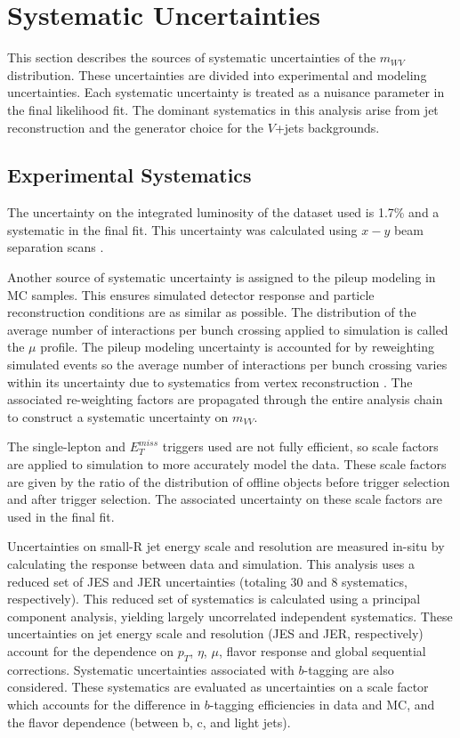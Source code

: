 \chapter{Systematic Uncertainties}
This section describes the sources of systematic uncertainties of the $m_{WV}$ distribution. These uncertainties are divided into experimental and modeling uncertainties. Each systematic uncertainty is treated as a nuisance parameter in the final likelihood fit. The dominant systematics in this analysis arise from jet reconstruction and the generator choice for the $V$+jets backgrounds.

\section{Experimental Systematics}
The uncertainty on the integrated luminosity of the dataset used is 1.7\% and a systematic in the final fit. This uncertainty was calculated using $x-y$ beam separation scans \cite{lumi_measurement}. 

Another source of systematic uncertainty is assigned to the pileup modeling in MC samples. This ensures simulated detector response and particle reconstruction conditions are as similar as possible. The distribution of the average number of interactions per bunch crossing applied to simulation is called the $\mu$ profile. The pileup modeling uncertainty is accounted for by reweighting simulated events so the average number of interactions per bunch crossing varies within its uncertainty due to systematics from vertex reconstruction \cite{vertexing}. The associated re-weighting factors are propagated through the entire analysis chain to construct a systematic uncertainty on $m_{VV}$.

The single-lepton and $E_{T}^{miss}$ triggers used are not fully efficient, so scale factors are applied to simulation to more accurately model the data. These scale factors are given by the ratio of the distribution of offline objects before trigger selection and after trigger selection. The associated uncertainty on these scale factors are used in the final fit.

Uncertainties on small-R jet energy scale and resolution are measured in-situ by calculating the response between data and simulation. This analysis uses a reduced set of JES and JER uncertainties (totaling 30 and 8 systematics, respectively). This reduced set of systematics is calculated using a principal component analysis, yielding largely uncorrelated independent systematics. These uncertainties on jet energy scale and resolution (JES and JER, respectively) account for the dependence on $p_{T}$, $\eta$, $\mu$, flavor response and global sequential corrections. Systematic uncertainties associated with $b$-tagging are also considered. These systematics are evaluated as uncertainties on a scale factor which accounts for the difference in $b$-tagging efficiencies in data and MC, and the flavor dependence (between b, c, and light jets). 

